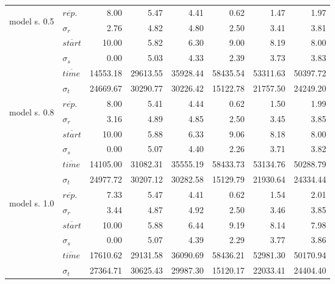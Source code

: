 \begin{tabular}{r l | r r r r r | r}
\hline
\multirow{6}{*}{\begin{sideways}model s. 0.5 \end{sideways}}
& $\overline{rep.}$ & 8.00 & 5.47 & 4.41 & 0.62 & 1.47 & 1.97 \\ 
& $\sigma_{r}$ & 2.76 & 4.82 & 4.80 & 2.50 & 3.41 & 3.81 \\ 
& $\overline{start}$ & 10.00 & 5.82 & 6.30 & 9.00 & 8.19 & 8.00 \\ 
& $\sigma_{s}$ & 0.00 & 5.03 & 4.33 & 2.39 & 3.73 & 3.83 \\ 
& $\overline{time}$ & 14553.18 & 29613.55 & 35928.44 & 58435.54 & 53311.63 & 50397.72 \\ 
& $\sigma_{t}$ &  24669.67 & 30290.77 & 30226.42 & 15122.78 & 21757.50 & 24249.20 \\ 

\hline
\multirow{6}{*}{\begin{sideways}model s. 0.8 \end{sideways}}

& $\overline{rep.}$ &  8.00 & 5.41 & 4.44 & 0.62 & 1.50 & 1.99 \\ 
& $\sigma_{r}$ &  3.16 & 4.89 & 4.85 & 2.50 & 3.45 & 3.85 \\ 
& $\overline{start}$ & 10.00 & 5.88 & 6.33 & 9.06 & 8.18 & 8.00 \\ 
& $\sigma_{s}$ & 0.00 & 5.07 & 4.40 & 2.26 & 3.71 & 3.82 \\ 
& $\overline{time}$ & 14105.00 & 31082.31 & 35555.19 & 58433.73 & 53134.76 & 50288.79 \\ 
& $\sigma_{t}$ & 24977.72 & 30207.12 & 30282.58 & 15129.79 & 21930.64 & 24334.44 \\ 

\hline
\multirow{6}{*}{\begin{sideways}model s. 1.0 \end{sideways}}

& $\overline{rep.}$ & 7.33 & 5.47 & 4.41 & 0.62 & 1.54 & 2.01 \\ 
& $\sigma_{r}$ & 3.44 & 4.87 & 4.92 & 2.50 & 3.46 & 3.85 \\ 
& $\overline{start}$ & 10.00 & 5.88 & 6.44 & 9.19 & 8.14 & 7.98 \\ 
& $\sigma_{s}$ & 0.00 & 5.07 & 4.39 & 2.29 & 3.77 & 3.86 \\ 
& $\overline{time}$ & 17610.62 & 29131.58 & 36090.69 & 58436.21 & 52981.30 & 50170.94 \\ 
& $\sigma_{t}$ & 27364.71 & 30625.43 & 29987.30 & 15120.17 & 22033.41 & 24404.40 \\ 
   \hline
\end{tabular}